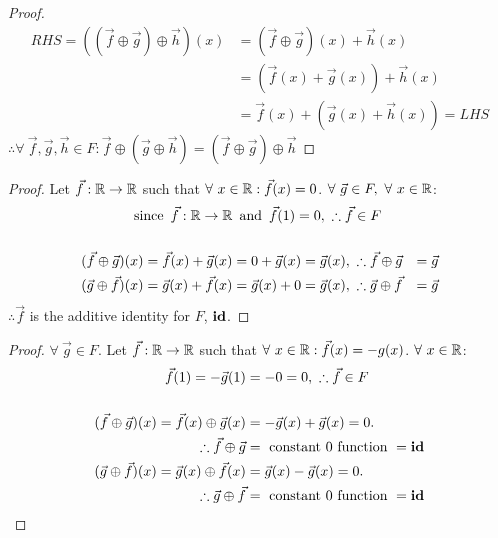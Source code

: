 \begin{enumerate}
\begin{proof}
\begin{align*}
      RHS = ((\vec{f} \oplus \vec{g}) \oplus \vec{h})(x) & = (\vec{f} \oplus \vec{g})(x) + \vec{h}(x)     \\
                                                         & = (\vec{f}(x) + \vec{g}(x)) + \vec{h}(x)       \\
                                                         & = \vec{f}(x) + (\vec{g}(x) + \vec{h}(x)) = LHS
    \end{align*}
    $\therefore \forall~\vec{f},\vec{g},\vec{h} \in F: \vec{f} \oplus (\vec{g} \oplus \vec{h}) = (\vec{f} \oplus \vec{g}) \oplus \vec{h}$
  \end{proof}
  \begin{proof}
    Let $\vec{f}: \mathbb{R} \rightarrow \mathbb{R}$ such that $\forall~x \in \mathbb{R}: \vec{f}(x) = 0$. $\forall~\vec{g} \in F,~\forall~x \in \mathbb{R}$:
    \begin{align*}
      \operatorname{~\text{since}~} \vec{f}: \mathbb{R} \rightarrow \mathbb{R}            & \operatorname{~\text{and}~} \vec{f}(1) = 0,~\therefore \vec{f} \in F                              \\ \\
      (\vec{f} \oplus \vec{g})(x) = \vec{f}(x) + \vec{g}(x) & = 0 + \vec{g}(x)= \vec{g}(x),~\therefore \vec{f} \oplus \vec{g} & = \vec{g} \\
      (\vec{g} \oplus \vec{f})(x) = \vec{g}(x) + \vec{f}(x) & = \vec{g}(x) + 0= \vec{g}(x),~\therefore \vec{g} \oplus \vec{f} & = \vec{g}
    \end{align*}
    $\therefore \vec{f}$ is the additive identity for $F$, $\operatorname{\textbf{id}}$.
  \end{proof}
  \begin{proof}
    $\forall~\vec{g} \in F$. Let $\vec{f}: \mathbb{R} \rightarrow \mathbb{R}$ such that $\forall~x \in \mathbb{R}: \vec{f}(x) = -g(x)$. $\forall~x \in \mathbb{R}$:
    \begin{align*}
      \vec{f}(1) = -\vec{g}(1)                                   & = -0 = 0,~\therefore \vec{f} \in F   \\ \\
      (\vec{f} \oplus \vec{g})(x) = \vec{f}(x) \oplus \vec{g}(x) & = -\vec{g}(x) + \vec{g}(x)= 0.       \\
      \therefore \vec{f} \oplus \vec{g}                          & = ~\text{constant 0 function}~ = \id \\
      (\vec{g} \oplus \vec{f})(x) = \vec{g}(x) \oplus \vec{f}(x) & = \vec{g}(x) - \vec{g}(x)= 0.        \\
      \therefore \vec{g} \oplus \vec{f}                          & = ~\text{constant 0 function}~ = \id

\end{align*}
\end{proof}
\end{enumerate}
